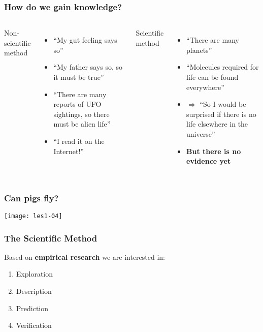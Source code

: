 \documentclass[aspectratio=169]{beamer}
\begin{document}
\begin{frame}
  \frametitle{How do we gain knowledge?}
  
  \begin{columns}[c]
    
    Non-scientific method
    \begin{itemize}
      \item ``My gut feeling says so''
      \item ``My father says so, so it must be true''
      \item ``There are many reports of UFO sightings, so there must be alien life''
      \item ``I read it on the Internet!''
    \end{itemize}
    
    \pause
    
    Scientific method
    \begin{itemize}
      \item ``There are many planets''
      \item ``Molecules required for life can be found everywhere''
      \item $\Rightarrow$ ``So I would be surprised if there is no life elsewhere in the universe''
      \item \textbf{But there is no evidence yet}
    \end{itemize}
    
  \end{columns}
\end{frame}

\begin{frame}
  \frametitle{Can pigs fly?}
  \centering
  \texttt{[image: les1-04]}
\end{frame}

\begin{frame}
  \frametitle{The Scientific Method}
  
  Based on \textbf{empirical research} we are interested in:
  
  \begin{enumerate}
    \item Exploration
    \item Description
    \item Prediction
    \item Verification
  \end{enumerate}
\end{frame}
\end{document}
